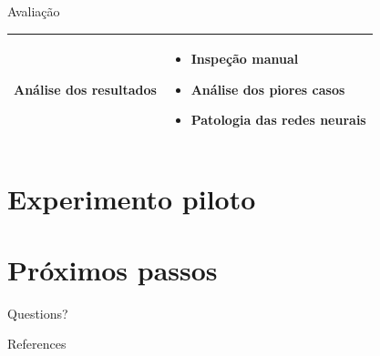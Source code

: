 \documentclass[10pt]{beamer}
\begin{document}
\begin{frame}{Avaliação}
   \begin{center}
       \begin{tabular}{|p{4cm}|p{4cm}|}
            \hline
            Análise dos resultados & \begin{itemize}
                \item Inspeção manual
                \item Análise dos piores casos
                \item Patologia das redes neurais \cite{feng-etal-2018-pathologies}
            \end{itemize} \\
            \hline
       \end{tabular}
   \end{center}
\end{frame}

\section{Experimento piloto}

\section{Próximos passos}



{
\begin{frame}[standout]
  Questions?
\end{frame}
}

\appendix



\begin{frame}[allowframebreaks]{References}

  
  

\end{frame}
\end{document}
